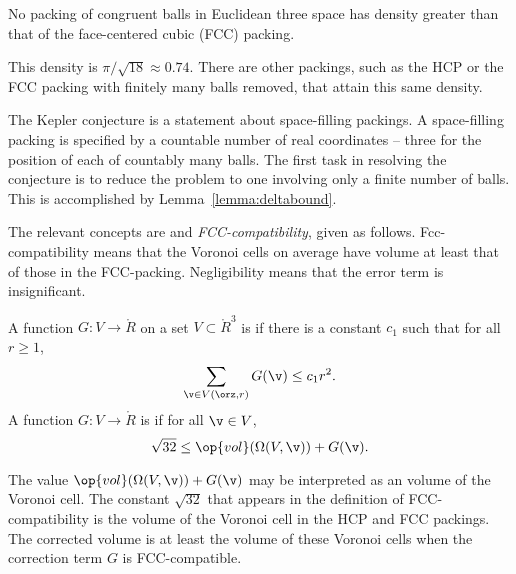\begin{theorem} 
\label{theorem:kepler}   
%
No packing of congruent balls in Euclidean three space has density
greater than that of the face-centered cubic (FCC) packing.
\end{theorem}

\begin{remark}
This density is $\pi/\sqrt{18}\approx 0.74$.  There are other
packings, such as the HCP or the FCC
packing with finitely many balls removed, that attain this
same density.
\end{remark}

The Kepler conjecture is a statement about space-filling packings.  A
space-filling packing is specified by a countable number of real coordinates --
three for the position of each of countably many balls.  The first
task in resolving the conjecture is to reduce the problem to one
involving only a finite number of balls.  This is accomplished by
Lemma~\ref{lemma:deltabound}.

The relevant concepts are  and {\it
  FCC-compatibility}, given as follows.  Fcc-compatibility means that
the Voronoi cells on average have volume at least that of those in the
FCC-packing.  Negligibility means that the error term is insignificant.


\begin{definition}\label{def:negligible}
A function $G:V\to \ring{R}$ on a set $V\subset\ring{R}^3$
is 
if there is a constant $c_1$ such that for all $r\ge1$,
\[ \sum_{\v\in V(\orz,r)} G(\v) \le c_1
r^2.\] 
A function $G: V\to\ring{R}$ is
if for all $\v\in V$, 
\[ \sqrt{32}\le \op{vol}(\Omega(V,\v)) +
G(\v).\] 
%
%
%
\end{definition}


\begin{remark}
  The value $\op{vol}(\Omega(V,\v)) + G(\v)$ may be interpreted as an
   volume of the Voronoi cell. The constant
  $\sqrt{32}$ that appears in the definition of FCC-compatibility is
  the volume of the Voronoi cell in the HCP and FCC packings.  The
  corrected volume is at least the volume of these Voronoi cells when
  the correction term $G$ is FCC-compatible.  
%
%
\end{remark}

